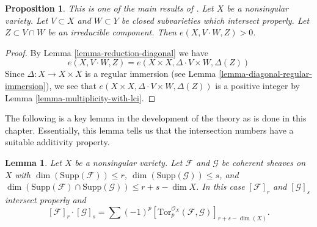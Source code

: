 \documentclass{stacks-project}
\newenvironment{reference}{\comment}{\endcomment}
\theoremstyle{plain}
\newtheorem{proposition}[subsection]{Proposition}
\newtheorem{lemma}[subsection]{Lemma}
\theoremstyle{definition}
\theoremstyle{remark}
\numberwithin{equation}{subsection}
\begin{document}
\begin{proposition}
\label{proposition-positivity}
\begin{reference}
This is one of the main results of \cite{Serre_algebre_locale}.
\end{reference}
Let $X$ be a nonsingular variety. Let $V \subset X$ and
$W \subset Y$ be closed subvarieties which intersect properly.
Let $Z \subset V \cap W$ be an irreducible component.
Then $e(X, V \cdot W, Z) > 0$.
\end{proposition}

\begin{proof}
By Lemma \ref{lemma-reduction-diagonal} we have
$$
e(X, V \cdot W, Z) = e(X \times X, \Delta \cdot V \times W, \Delta(Z))
$$
Since $\Delta : X \to X \times X$ is a regular immersion
(see Lemma \ref{lemma-diagonal-regular-immersion}), we see that
$e(X \times X, \Delta \cdot V \times W, \Delta(Z))$ is a positive
integer by Lemma \ref{lemma-multiplicity-with-lci}.
\end{proof}

\noindent
The following is a key lemma in the development of the theory as
is done in this chapter. Essentially, this lemma tells us that
the intersection numbers have a suitable additivity property.

\begin{lemma}
\label{lemma-tor-sheaf}
\begin{reference}
\cite[Chapter V]{Serre_algebre_locale}
\end{reference}
Let $X$ be a nonsingular variety. Let $\mathcal{F}$ and
$\mathcal{G}$ be coherent sheaves on $X$ with
$\dim(\text{Supp}(\mathcal{F})) \leq r$,
$\dim(\text{Supp}(\mathcal{G})) \leq s$, and
$\dim(\text{Supp}(\mathcal{F}) \cap \text{Supp}(\mathcal{G}) )
\leq r + s - \dim X$. In this case $[\mathcal{F}]_r$ and $[\mathcal{G}]_s$
intersect properly and
$$
[\mathcal{F}]_r \cdot [\mathcal{G}]_s =
\sum (-1)^p
[\text{Tor}_p^{\mathcal{O}_X}(\mathcal{F}, \mathcal{G})]_{r + s - \dim(X)}.
$$
\end{lemma}
\end{document}
